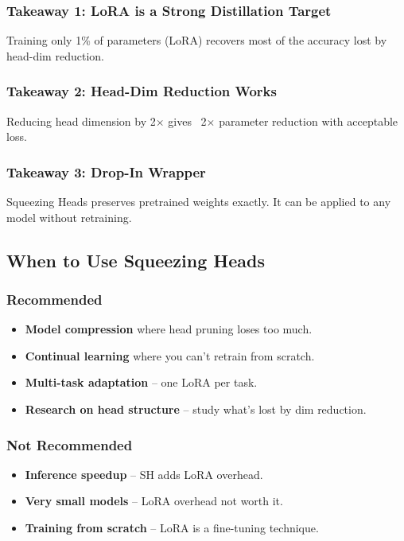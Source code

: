 \subsubsection{Takeaway 1: LoRA is a Strong Distillation Target}

Training only 1\% of parameters (LoRA) recovers most of the accuracy lost 
by head-dim reduction.

\subsubsection{Takeaway 2: Head-Dim Reduction Works}

Reducing head dimension by 2$\times$ gives ~2$\times$ parameter 
reduction with acceptable loss.

\subsubsection{Takeaway 3: Drop-In Wrapper}

Squeezing Heads preserves pretrained weights exactly. It can be applied 
to any model without retraining.

\subsection{When to Use Squeezing Heads}

\subsubsection{Recommended}

\begin{itemize}
\item \textbf{Model compression} where head pruning loses too much.
\item \textbf{Continual learning} where you can't retrain from scratch.
\item \textbf{Multi-task adaptation} -- one LoRA per task.
\item \textbf{Research on head structure} -- study what's lost by dim reduction.

\end{itemize}
\subsubsection{Not Recommended}

\begin{itemize}
\item \textbf{Inference speedup} -- SH adds LoRA overhead.
\item \textbf{Very small models} -- LoRA overhead not worth it.
\item \textbf{Training from scratch} -- LoRA is a fine-tuning technique.

\end{itemize}

